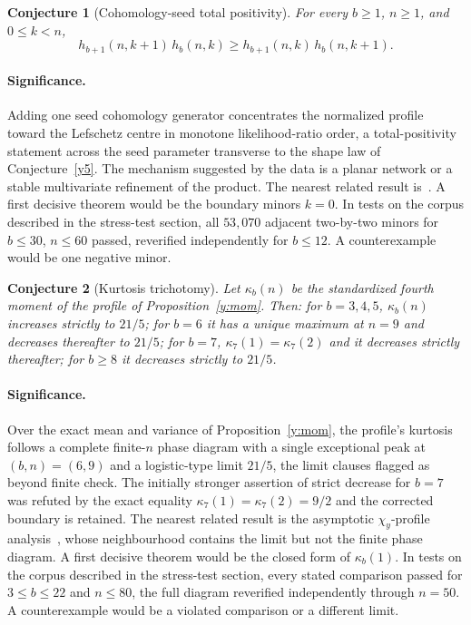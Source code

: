 \documentclass[11pt]{article}
\newtheorem{conjecture}{Conjecture}
\theoremstyle{definition}
\begin{document}
\begin{conjecture}[Cohomology-seed total positivity]\label{y6}
For every $b\ge1$, $n\ge1$, and $0\le k<n$,
\[
h_{b+1}(n,k+1)\,h_b(n,k)\ge h_{b+1}(n,k)\,h_b(n,k+1).
\]
\end{conjecture}

\paragraph{Significance.}
Adding one seed cohomology generator concentrates the normalized profile toward the Lefschetz centre in monotone likelihood-ratio order, a total-positivity statement across the seed parameter transverse to the shape law of Conjecture~\ref{y5}.  The mechanism suggested by the data is a planar network or a stable multivariate refinement of the product.  The nearest related result is~\cite{Go90}.  A first decisive theorem would be the boundary minors $k=0$.  In tests on the corpus described in the stress-test section, all $53{,}070$ adjacent two-by-two minors for $b\le30$, $n\le60$ passed, reverified independently for $b\le12$.  A counterexample would be one negative minor.

\begin{conjecture}[Kurtosis trichotomy]\label{y7}
Let $\kappa_b(n)$ be the standardized fourth moment of the profile of Proposition~\ref{y:mom}.  Then: for $b=3,4,5$, $\kappa_b(n)$ increases strictly to $21/5$; for $b=6$ it has a unique maximum at $n=9$ and decreases thereafter to $21/5$; for $b=7$, $\kappa_7(1)=\kappa_7(2)$ and it decreases strictly thereafter; for $b\ge8$ it decreases strictly to $21/5$.
\end{conjecture}

\paragraph{Significance.}
Over the exact mean and variance of Proposition~\ref{y:mom}, the profile's kurtosis follows a complete finite-$n$ phase diagram with a single exceptional peak at $(b,n)=(6,9)$ and a logistic-type limit $21/5$, the limit clauses flagged as beyond finite check.  The initially stronger assertion of strict decrease for $b=7$ was refuted by the exact equality $\kappa_7(1)=\kappa_7(2)=9/2$ and the corrected boundary is retained.  The nearest related result is the asymptotic $\chi_y$-profile analysis~\cite{MZR15}, whose neighbourhood contains the limit but not the finite phase diagram.  A first decisive theorem would be the closed form of $\kappa_b(1)$.  In tests on the corpus described in the stress-test section, every stated comparison passed for $3\le b\le22$ and $n\le80$, the full diagram reverified independently through $n=50$.  A counterexample would be a violated comparison or a different limit.
\end{document}
